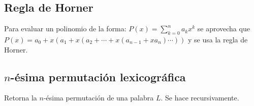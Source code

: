 \subsection{Regla de Horner}
Para evaluar un polinomio de la forma: $P(x) = \sum_{k=0}^n a_{k}x^{k}$ se aprovecha que \\$P(x) = a_{0}+x(a_{1}+x(a_{2}+\cdots+x(a_{n-1}+xa_{n})\cdots))$ y se usa la regla de Horner.
\subsection{$n$-\'esima permutaci\'on lexicogr\'afica}
Retorna la $n$-\'esima permutaci\'on de una palabra $L$. Se hace recursivamente.
